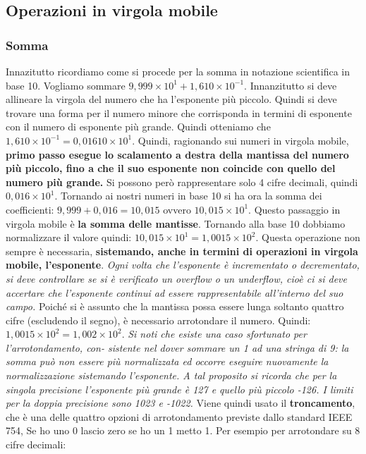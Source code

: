 \documentclass[a4paper,12pt, oneside]{book}
\begin{document}
\subsection{Operazioni in virgola mobile}
\subsubsection{Somma}
Innazitutto ricordiamo come si procede per la somma in notazione scientifica in base 10. Vogliamo sommare $9,999\times 10^1 + 1,610 \times 10^{-1}$. Innanzitutto si deve allineare la virgola del numero che ha l'esponente più piccolo. Quindi si deve trovare una forma per il numero minore che corrisponda in
termini di esponente con il numero di esponente più grande. Quindi otteniamo che $1,610 \times 10^{-1}=0,01610\times 10^1$. Quindi, ragionando sui numeri in virgola mobile, \textbf{primo passo esegue lo scalamento a destra della mantissa del numero più piccolo, fino a che il suo esponente non coincide con quello del
  numero più grande.} Si possono però rappresentare solo 4 cifre decimali, quindi $0,016\times 10^1$. Tornando ai nostri numeri in base 10 si ha ora la somma dei coefficienti: $9,999+0,016 = 10,015$ ovvero $10,015\times 10^1$. Questo passaggio in virgola mobile è \textbf{la somma delle mantisse}. Tornando alla base 10 dobbiamo normalizzare il valore quindi: $10,015\times 10^1 = 1,0015\times 10^2$. Questa operazione non sempre è necessaria, \textbf{sistemando, anche in termini di operazioni in virgola mobile, l'esponente}. \textit{Ogni volta che l'esponente è incrementato o decrementato, si deve
  controllare se si è verificato un overflow o un underflow, cioè ci si
  deve accertare che l'esponente continui ad essere rappresentabile
  all'interno del suo campo.} Poiché si è assunto che la mantissa possa essere lunga soltanto quattro cifre (escludendo il segno), è necessario arrotondare il numero.
Quindi: $1,0015\times 10^2 = 1,002\times 10^2$. \textit{Si noti che esiste una caso sfortunato per l'arrotondamento, con-
  sistente nel dover sommare un 1 ad una stringa di 9: la somma può
  non essere più normalizzata ed occorre eseguire nuovamente la normalizzazione sistemando l'esponente. A tal proposito si ricorda che per la singola precisione l'esponente più grande è 127 e quello più piccolo -126. I limiti per la doppia precisione sono 1023 e -1022.} Viene quindi usato il \textbf{troncamento}, che è una delle quattro
opzioni di arrotondamento previste dallo standard IEEE 754, Se ho uno 0 lascio zero se ho un 1 metto 1. Per esempio per arrotondare su 8 cifre decimali:
\end{document}
